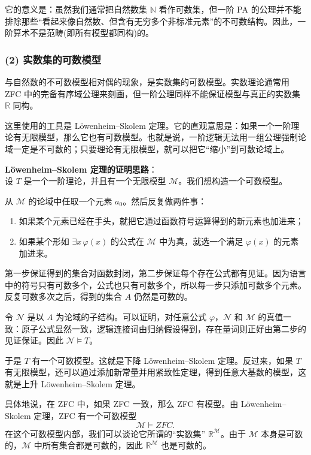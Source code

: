 \documentclass[12pt, a4paper]{article}
\begin{document}
它的意义是：虽然我们通常把自然数集 \(\mathbb{N}\) 看作可数集，但一阶 PA 的公理并不能排除那些“看起来像自然数、但含有无穷多个非标准元素”的不可数结构。因此，一阶算术不是范畴(即所有模型都同构)的。

\subsubsection*{(2) 实数集的可数模型}

与自然数的不可数模型相对偶的现象，是实数集的可数模型。实数理论通常用 ZFC 中的完备有序域公理来刻画，但一阶公理同样不能保证模型与真正的实数集 \(\mathbb{R}\) 同构。

这里使用的工具是 Löwenheim–Skolem 定理。它的直观意思是：如果一个一阶理论有无限模型，那么它也有可数模型。也就是说，一阶逻辑无法用一组公理强制论域一定是不可数的；只要理论有无限模型，就可以把它“缩小”到可数论域上。

\textbf{Löwenheim–Skolem 定理的证明思路}：\\
设 \(T\) 是一个一阶理论，并且有一个无限模型 \(\mathcal{M}\)。我们想构造一个可数模型。

从 \(\mathcal{M}\) 的论域中任取一个元素 \(a_0\)。然后反复做两件事：

\begin{enumerate}
    \item 如果某个元素已经在手头，就把它通过函数符号运算得到的新元素也加进来；
    \item 如果某个形如 \(\exists x\,\varphi(x)\) 的公式在 \(\mathcal{M}\) 中为真，就选一个满足 \(\varphi(x)\) 的元素加进来。
\end{enumerate}

第一步保证得到的集合对函数封闭，第二步保证每个存在公式都有见证。因为语言中的符号只有可数多个，公式也只有可数多个，所以每一步只添加可数多个元素。反复可数多次之后，得到的集合 \(A\) 仍然是可数的。

令 \(\mathcal{N}\) 是以 \(A\) 为论域的子结构。可以证明，对任意公式 \(\varphi\)，\(\mathcal{N}\) 和 \(\mathcal{M}\) 的真值一致：原子公式显然一致，逻辑连接词由归纳假设得到，存在量词则正好由第二步的见证保证。因此 \(\mathcal{N}\models T\)。

于是 \(T\) 有一个可数模型。这就是下降 Löwenheim–Skolem 定理。反过来，如果 \(T\) 有无限模型，还可以通过添加新常量并用紧致性定理，得到任意大基数的模型，这就是上升 Löwenheim–Skolem 定理。

具体地说，在 ZFC 中，如果 ZFC 一致，那么 ZFC 有模型。由 Löwenheim–Skolem 定理，ZFC 有一个可数模型
\[
\mathcal{M}\models ZFC.
\]
在这个可数模型内部，我们可以谈论它所谓的“实数集” \(\mathbb{R}^{\mathcal{M}}\)。由于 \(\mathcal{M}\) 本身是可数的，\(\mathcal{M}\) 中所有集合都是可数的，因此 \(\mathbb{R}^{\mathcal{M}}\) 也是可数的。
\end{document}
